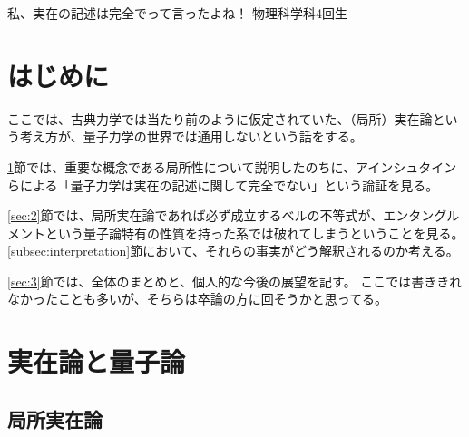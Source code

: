 \documentclass[10pt,b5paper,papersize,dvipdfmx]{jsbook}
\begin{document}

\newcommand\karizu[1]{\begin{center}（図：#1）\end{center}}
\renewcommand\textcolor[2]{#2}
\newcommand\setu[1]{\ref{sec:#1}節}
\newcommand\subsetu[1]{\ref{subsec:#1}節}

\newif\ifsecI
\newif\ifsecII

\secItrue
\secIItrue


\kaishititle%
  {私、実在の記述は完全でって言ったよね！}%
  {物理科学科4回生}%
  {}%


\section*{はじめに}
ここでは、古典力学では当たり前のように仮定されていた、（局所）実在論という考え方が、量子力学の世界では通用しないという話をする。\par
\setu{1}では、重要な概念である局所性について説明したのちに、アインシュタインらによる「量子力学は実在の記述に関して完全でない」という論証を見る。\par
\setu{2}では、局所実在論であれば必ず成立するベルの不等式が、エンタングルメントという量子論特有の性質を持った系では破れてしまうということを見る。
\subsetu{interpretation}において、それらの事実がどう解釈されるのか考える。\par
\setu{3}では、全体のまとめと、個人的な今後の展望を記す。
ここでは書ききれなかったことも多いが、そちらは卒論の方に回そうかと思ってる。


\ifsecI
\section{実在論と量子論}\label{sec:1}

%
\subsection{局所実在論} %
\end{document}
